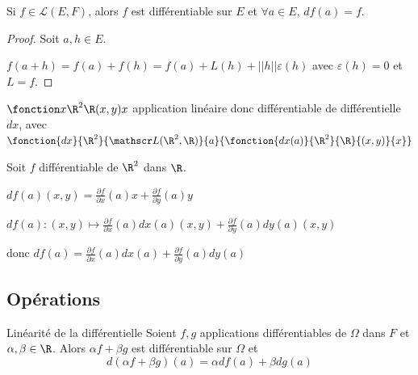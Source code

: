 \begin{exemple}
    Si $f \in \mathscr L(E, F)$, alors $f$ est différentiable sur $E$ et 
    $\forall a \in E$, $df(a) = f$.

    \begin{proof}
        Soit $a, h \in E$. 

        $f(a + h) = f(a) + f(h) = f(a) + L(h) + ||h|| \varepsilon(h)$ avec
        $\varepsilon(h) = 0$ et $L = f$. 
    \end{proof}
\end{exemple}

\begin{exemple}
    $\fonction x {\R^2}{\R}{(x, y)}{x}$ application linéaire donc différentiable de différentielle 
    $dx$, avec $\fonction{dx}{\R^2}{\mathscr L(\R^2, \R)}{a}{\fonction{dx(a)}{\R^2}{\R}{(x, y)}{x}}$

    Soit $f$ différentiable de $\R^2$ dans $\R$. 

    $\displaystyle df(a)(x, y) = \frac{\partial f }{\partial x }(a) x + \frac{\partial f }{\partial y }(a) y$

    
    $\displaystyle df(a) : (x, y) \mapsto \frac{\partial f }{\partial x }(a) dx(a) (x, y) + \frac{\partial f }{\partial y }(a) dy(a) (x, y)$

    donc $\displaystyle df(a) = \frac{\partial f }{\partial x }(a) dx(a) + \frac{\partial f }{\partial y }(a) dy(a)$
\end{exemple}

\subsection{Opérations }

\begin{proposition}{Linéarité de la différentielle}{}
    Soient $f, g$ applications différentiables de $\Omega$ dans $F$ et $\alpha, \beta \in \R$.
    Alors $\alpha f + \beta g$ est différentiable sur $\Omega$ et
    $$d(\alpha f + \beta g)(a) = \alpha df(a) + \beta dg(a)$$   
\end{proposition}


